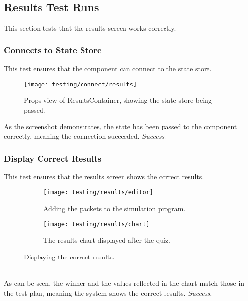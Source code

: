\subsection{Results Test Runs} %
\label{sub:results_test_runs}
This section tests that the results screen works correctly.

\subsubsection{Connects to State Store} %
\label{ssub:connects_to_state_store}
This test ensures that the component can connect to the state store.
\begin{figure}[h!]
  \texttt{[image: testing/connect/results]}
  \caption{Props view of ResultsContainer, showing the state store being passed.}
\end{figure}
As the screenshot demonstrates, the state has been passed to the component correctly, meaning the connection succeeded. \textit{Success.}

\clearpage

\subsubsection{Display Correct Results} %
\label{ssub:display_correct_results}
This test ensures that the results screen shows the correct results.
\begin{figure}[!htbp]
\centering
\begin{subfigure}{0.5\textwidth}
  \centering
  \texttt{[image: testing/results/editor]}
  \caption{Adding the packets to the simulation program.}
  \label{fig:sub1}
\end{subfigure}%
\begin{subfigure}{0.5\textwidth}
  \centering
  \texttt{[image: testing/results/chart]}
  \caption{The results chart displayed after the quiz.}
  \label{fig:sub2}
\end{subfigure}
\caption{Displaying the correct results.}
\label{fig:test}
\end{figure}
\\As can be seen, the winner and the values reflected in the chart match those in the test plan, meaning the system shows the correct results. \textit{Success.}
